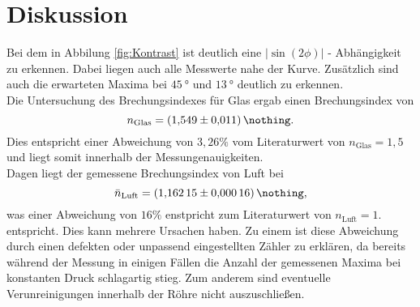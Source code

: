 \FloatBarrier
\newpage
\section{Diskussion}
Bei dem in Abbilung \ref{fig:Kontrast} ist deutlich eine $|\sin{(2\phi)}|$ - Abhängigkeit zu erkennen. Dabei liegen auch alle Messwerte nahe der Kurve. Zusätzlich sind auch die erwarteten Maxima bei $\SI{45}{\degree}$ und $\SI{13}{\degree}$ deutlich zu erkennen. \\
Die Untersuchung des Brechungsindexes für Glas ergab einen Brechungsindex von
\begin{equation}
    n_\text{Glas} = \SI{1.549 \pm 0.011}{\nothing} .
\end{equation}
Dies entspricht einer Abweichung von $3,26 \%$ vom Literaturwert von $n_\text{Glas} = 1,5$ und liegt somit innerhalb der Messungenauigkeiten.  \\
Dagen liegt der gemessene Brechungsindex von Luft bei
\begin{equation}
    \bar{n}_\text{Luft} = \SI{1.16215 \pm 0.00016}{\nothing} ,
 \end{equation}
was einer Abweichung von $16 \%$ enstpricht zum Literaturwert von $n_\text{Luft} = 1$. entspricht. Dies kann mehrere Ursachen haben. Zu einem ist diese Abweichung durch einen defekten oder unpassend eingestellten Zähler zu erklären, da bereits während der Messung in einigen Fällen die Anzahl der gemessenen Maxima bei konstanten Druck schlagartig stieg. Zum anderem sind eventuelle Verunreinigungen innerhalb der Röhre nicht auszuschließen.
